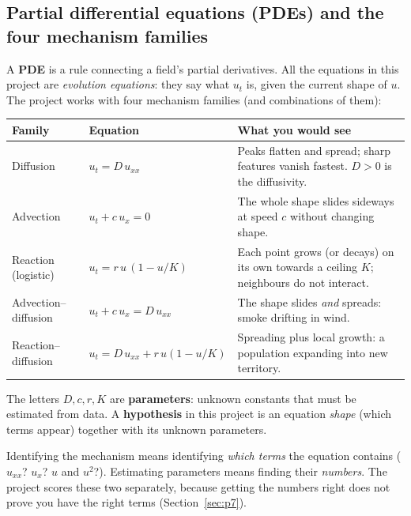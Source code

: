 \subsection{Partial differential equations (PDEs) and the four mechanism families}

A \textbf{PDE} is a rule connecting a field's partial derivatives. All the equations in this project are
\emph{evolution equations}: they say what $u_t$ is, given the current shape of $u$. The project works with four
mechanism families (and combinations of them):

\begin{center}
\small
\begin{tabular}{@{}p{3.0cm}p{4.2cm}p{7.6cm}@{}}
\toprule
\textbf{Family} & \textbf{Equation} & \textbf{What you would see} \\ \midrule
Diffusion & $u_t = D\,u_{xx}$ & Peaks flatten and spread; sharp features vanish fastest. $D>0$ is the diffusivity. \\
Advection & $u_t + c\,u_x = 0$ & The whole shape slides sideways at speed $c$ without changing shape. \\
Reaction (logistic) & $u_t = r\,u\,(1-u/K)$ & Each point grows (or decays) on its own towards a ceiling $K$; neighbours do not interact. \\
Advection--diffusion & $u_t + c\,u_x = D\,u_{xx}$ & The shape slides \emph{and} spreads: smoke drifting in wind. \\
Reaction--diffusion & $u_t = D\,u_{xx} + r\,u(1-u/K)$ & Spreading plus local growth: a population expanding into new territory. \\
\bottomrule
\end{tabular}
\end{center}

The letters $D, c, r, K$ are \textbf{parameters}: unknown constants that must be estimated from data. A
\textbf{hypothesis} in this project is an equation \emph{shape} (which terms appear) together with its unknown
parameters.

\begin{lesson}[: mechanism = which terms are present]
Identifying the mechanism means identifying \emph{which terms} the equation contains ($u_{xx}$? $u_x$? $u$ and
$u^2$?). Estimating parameters means finding their \emph{numbers}. The project scores these two separately,
because getting the numbers right does not prove you have the right terms (Section~\ref{sec:p7}).
\end{lesson}

